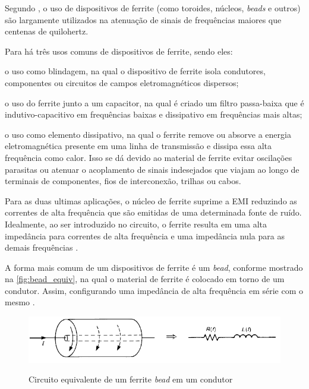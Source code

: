             Segundo , o uso de dispositivos de ferrite (como toroides, núcleos, \textit{beads} e outros) são largamente utilizados na atenuação de sinais de frequências maiores que centenas de quilohertz. 
            
            Para  há três usos comuns de dispositivos de ferrite, sendo eles:  
            
            \begin{alineas}
                \item o uso como blindagem, na qual o dispositivo de ferrite isola condutores, componentes ou circuitos de campos eletromagnéticos dispersos;
                
                \item o uso do ferrite junto a um capacitor, na qual é criado um filtro passa-baixa que é indutivo-capacitivo em frequências baixas e dissipativo em frequências mais altas;
                
                \item o uso como elemento dissipativo, na qual o ferrite remove ou absorve a energia eletromagnética presente em uma linha de transmissão e dissipa essa alta frequência como calor. Isso se dá devido ao material de ferrite evitar oscilações parasitas ou atenuar o acoplamento de sinais indesejados que viajam ao longo de terminais de componentes, fios de interconexão, trilhas ou cabos. 
            \end{alineas}
            
            Para as duas ultimas aplicações, o núcleo de ferrite suprime a EMI reduzindo as correntes de alta frequência que são emitidas de uma determinada fonte de ruído. Idealmente, ao ser introduzido no circuito, o ferrite resulta em uma alta impedância para correntes de alta frequência e uma impedância nula para as demais frequências \cite{ref:EMC_livro_PrintedCircuit}. 
            
            A forma mais comum de um dispositivos de ferrite é um \textit{bead}, conforme mostrado na \autoref{fig:bead_equiv}, na qual o material de ferrite é colocado em torno de um condutor. Assim, configurando uma impedância de alta frequência em série com o mesmo \cite{ref:EMC_livro_Paul}.
            
            \begin{figure}[H]
            	\centering
            	\caption{Circuito equivalente de um ferrite \textit{bead} em um condutor}
            	\includegraphics[scale=1]{pdf/outros/bead_equivalente.pdf}
            	\label{fig:bead_equiv}
            \end{figure}
            
